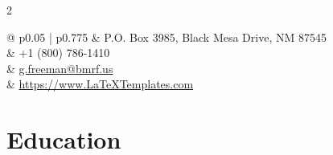 \documentclass[
	10pt, %
]{FreemanCV}
\begin{document}
\begin{paracol}{2}
\medskip %


\switchcolumn %


\parbox[top][0.11\textheight][c]{\linewidth}{ %
	\colorbox{shade}{ %
		\begin{supertabular}{@{\hspace{3pt}} p{0.05\linewidth} | p{0.775\linewidth}} %
			\raisebox{-1pt}{\faHome} & P.O. Box 3985, Black Mesa Drive, NM 87545 \\ %
			\raisebox{-1pt}{\faPhone} & +1 (800) 786-1410 \\ %
			\raisebox{-1pt}{\small\faEnvelope} & \href{mailto:g.freeman@bmrf.us}{g.freeman@bmrf.us} \\ %
			\raisebox{-1pt}{\small\faDesktop} & \href{https://www.LaTeXTemplates.com}{https://www.LaTeXTemplates.com} \\ %
		\end{supertabular}
	}
	\vfill %
}


\section{Education} 



\end{paracol}
\end{document}
